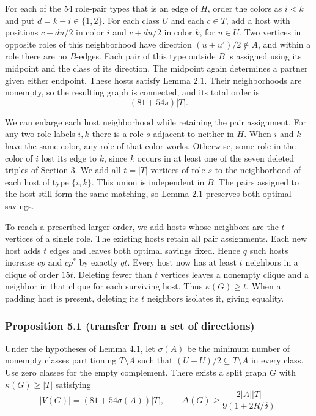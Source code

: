 \documentclass[english,11pt,a4paper]{article}
\newcounter{none}
\begin{document}
For each of the 54 role-pair types that is an edge of \(H\), order the colors as \(i<k\) and put \(d=k-i\in\{1,2\}\). For each class \(U\) and each \(c\in T\), add a host with positions \(c-du/2\) in color \(i\) and \(c+du/2\) in color \(k\), for \(u\in U\). Two vertices in opposite roles of this neighborhood have direction \((u+u')/2\notin A\), and within a role there are no \(B\)-edges. Each pair of this type outside \(B\) is assigned using its midpoint and the class of its direction. The midpoint again determines a partner given either endpoint. These hosts satisfy Lemma 2.1. Their neighborhoods are nonempty, so the resulting graph is connected, and its total order is
\[(81+54s)|T|.\]

We can enlarge each host neighborhood while retaining the pair assignment. For any two role labels \(i,k\) there is a role \(s\) adjacent to neither in \(H\). When \(i\) and \(k\) have the same color, any role of that color works. Otherwise, some role in the color of \(i\) lost its edge to \(k\), since \(k\) occurs in at least one of the seven deleted triples of Section 3. We add all \(t=|T|\) vertices of role \(s\) to the neighborhood of each host of type \(\{i,k\}\). This union is independent in \(B\). The pairs assigned to the host still form the same matching, so Lemma 2.1 preserves both optimal savings.

To reach a prescribed larger order, we add hosts whose neighbors are the \(t\) vertices of a single role. The existing hosts retain all pair assignments. Each new host adds \(t\) edges and leaves both optimal savings fixed. Hence \(q\) such hosts increase \(cp\) and \(cp^*\) by exactly \(qt\). Every host now has at least \(t\) neighbors in a clique of order \(15t\). Deleting fewer than \(t\) vertices leaves a nonempty clique and a neighbor in that clique for each surviving host. Thus \(\kappa(G)\ge t\). When a padding host is present, deleting its \(t\) neighbors isolates it, giving equality.

\subsubsection{Proposition 5.1 (transfer from a set of directions)}\label{proposition-5.1-transfer-from-a-set-of-directions}

Under the hypotheses of Lemma 4.1, let \(\sigma(A)\) be the minimum number of nonempty classes partitioning \(T\setminus A\) such that \((U+U)/2\subseteq T\setminus A\) in every class. Use zero classes for the empty complement. There exists a split graph \(G\) with \(\kappa(G)\ge|T|\) satisfying
\[|V(G)|=(81+54\sigma(A))|T|,\qquad
\Delta(G)\ge\frac{2|A||T|}{9(1+2R/\delta)}.\]
\end{document}
